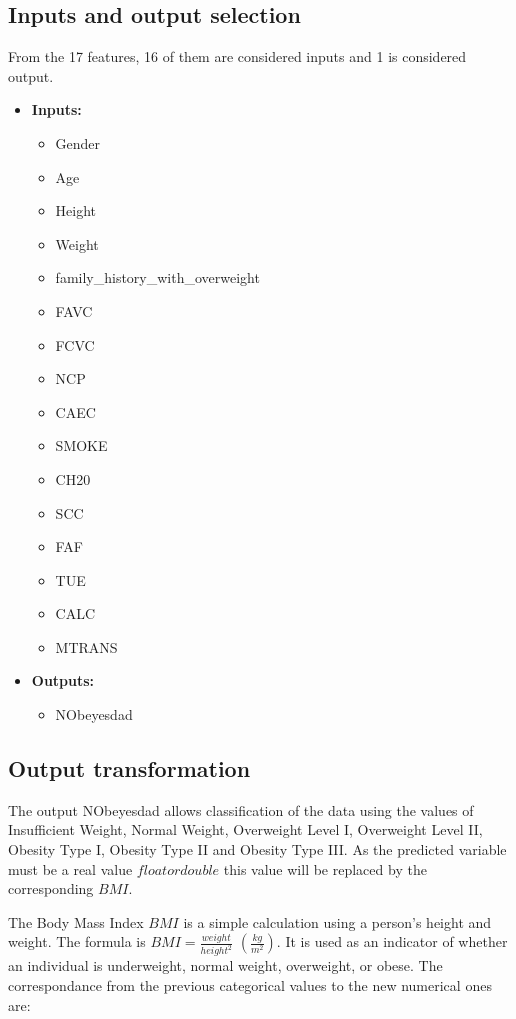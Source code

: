 \documentclass[11pt, a4paper]{article}
\begin{document}
\newpage

\subsection{Inputs and output selection}

From the 17 features, 16 of them are considered inputs and 1 is considered output.

\begin{itemize}
    \item \textbf{Inputs:}
    \begin{itemize}
        \item Gender
        \item Age
        \item Height
        \item Weight
        \item family\_history\_with\_overweight
        \item FAVC
        \item FCVC
        \item NCP
        \item CAEC
        \item SMOKE
        \item CH20
        \item SCC
        \item FAF
        \item TUE
        \item CALC
        \item MTRANS
    \end{itemize}
    \item \textbf{Outputs:}
    \begin{itemize}
        \item NObeyesdad
    \end{itemize}
\end{itemize}

\subsection{Output transformation}

The output NObeyesdad allows classification of the data using the values of Insufficient Weight, Normal Weight, Overweight Level I, 
Overweight Level II, Obesity Type I, Obesity Type II and Obesity Type III. As the predicted variable must be a real value \(float or double\) 
this value will be replaced by the corresponding \(BMI\).

\vspace{1em}The Body Mass Index \(BMI\) is a simple calculation using a person's height and weight. The formula is \(BMI = \frac{weight}{height^{2}}\) 
\((\frac{kg}{m^{2}})\). It is used as an indicator of whether an individual is underweight, normal weight, overweight, or obese. The correspondance from the 
previous  categorical values to the new numerical ones are:
\end{document}
